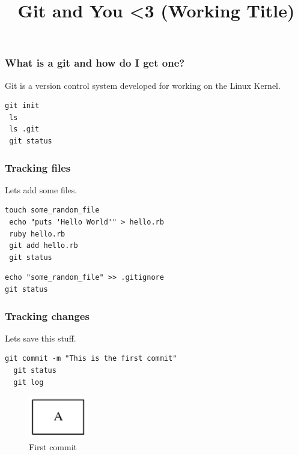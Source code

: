 \documentclass{beamer}
\title{Git and You <3 (Working Title)}
\begin{document}
\begin{frame}[fragile]
\frametitle{What is a git and how do I get one?}
Git is a version control system developed for working on the Linux Kernel.

\vspace{1em}

\begin{lstlisting}[frame=single]
 git init
 ls
 ls .git
 git status
\end{lstlisting}

\end{frame}

\begin{frame}[fragile]
\frametitle{Tracking files}

Lets add some files.

\vspace{1em}

\begin{lstlisting}[frame=single]
 touch some_random_file
 echo "puts 'Hello World'" > hello.rb
 ruby hello.rb
 git add hello.rb
 git status
\end{lstlisting}

\vspace{1em}

\begin{lstlisting}[frame=single]
echo "some_random_file" >> .gitignore
git status
\end{lstlisting}

\end{frame}

\begin{frame}[fragile]
\frametitle{Tracking changes}

Lets save this stuff.

\vspace{1em}

\begin{lstlisting}[frame=single]
  git commit -m "This is the first commit"
  git status
  git log
\end{lstlisting}

\begin{figure}[p]
  \centering
  \includegraphics[height=5em]{first_commit.png}
  \caption{First commit}
\end{figure}

\end{frame}
\end{document}
